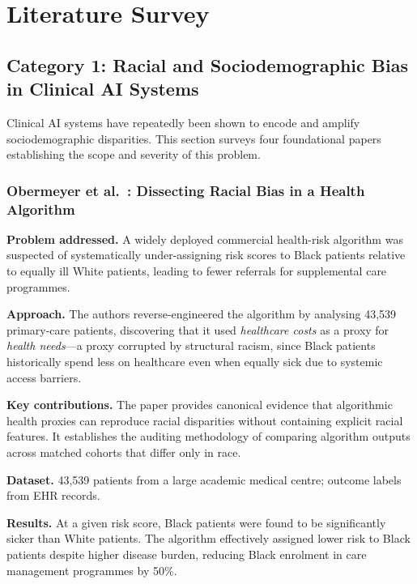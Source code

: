 \documentclass[12pt,a4paper]{article}
\begin{document}
\section{Literature Survey}

\subsection{Category 1: Racial and Sociodemographic Bias in Clinical AI Systems}

Clinical AI systems have repeatedly been shown to encode and amplify
sociodemographic disparities. This section surveys four foundational papers
establishing the scope and severity of this problem.

\subsubsection*{Obermeyer et al.\ \cite{obermeyer2019}: Dissecting Racial Bias
in a Health Algorithm}

\textbf{Problem addressed.}
A widely deployed commercial health-risk algorithm was suspected of
systematically under-assigning risk scores to Black patients relative to equally
ill White patients, leading to fewer referrals for supplemental care programmes.

\textbf{Approach.}
The authors reverse-engineered the algorithm by analysing 43,539 primary-care
patients, discovering that it used \emph{healthcare costs} as a proxy for
\emph{health needs}---a proxy corrupted by structural racism, since Black patients
historically spend less on healthcare even when equally sick due to systemic
access barriers.

\textbf{Key contributions.}
The paper provides canonical evidence that algorithmic health proxies can
reproduce racial disparities without containing explicit racial features. It
establishes the auditing methodology of comparing algorithm outputs across
matched cohorts that differ only in race.

\textbf{Dataset.}
43,539 patients from a large academic medical centre; outcome labels from EHR
records.

\textbf{Results.}
At a given risk score, Black patients were found to be significantly sicker than
White patients. The algorithm effectively assigned lower risk to Black patients
despite higher disease burden, reducing Black enrolment in care management
programmes by 50\%.
\end{document}

